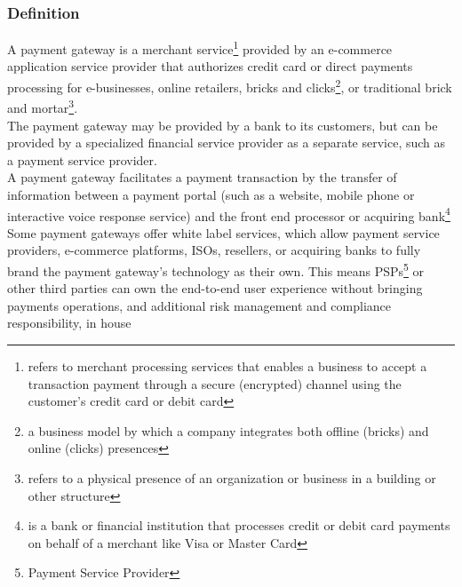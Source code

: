 \documentclass[12pt,a4paper]{article}
\begin{document}
	\subsubsection{Definition}
	A payment gateway is a merchant service\footnote{refers to merchant processing services that enables a business to accept a transaction payment through a secure (encrypted) channel using the customer's credit card or debit card} provided by an e-commerce application service provider that authorizes credit card or direct payments processing for e-businesses, online retailers, bricks and clicks\footnote{a business model by which a company integrates both offline (bricks) and online (clicks) presences}, or traditional brick and mortar\footnote{refers to a physical presence of an organization or business in a building or other structure}. \\
	The payment gateway may be provided by a bank to its customers, but can be provided by a specialized financial service provider as a separate service, such as a payment service provider.\\
	A payment gateway facilitates a payment transaction by the transfer of information between a payment portal (such as a website, mobile phone or interactive voice response service) and the front end processor or acquiring bank\footnote{is a bank or financial institution that processes credit or debit card payments on behalf of a merchant like Visa or Master Card}
	Some payment gateways offer white label services, which allow payment service providers, e-commerce platforms, ISOs, resellers, or acquiring banks to fully brand the payment gateway’s technology as their own. This means PSPs\footnote{Payment Service Provider} or other third parties can own the end-to-end user experience without bringing payments operations,  and additional risk management and compliance responsibility, in house
\end{document}
